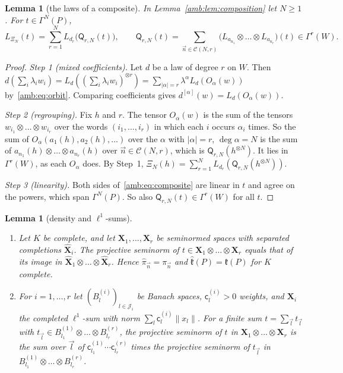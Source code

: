 \documentclass[11pt]{amsart}
\newtheorem{lemma}[theorem]{Lemma}
\theoremstyle{definition}
\theoremstyle{remark}
\numberwithin{equation}{section}
\newcommand{\abs}[1]{\lvert #1\rvert}
\newcommand{\norm}[1]{\lVert #1\rVert}
\theoremstyle{plain}
\theoremstyle{definition}
\theoremstyle{plain}
\begin{document}
\begin{lemma}[the laws of a composite]\label{amb:lem:composite-laws}
In Lemma~\ref{amb:lem:composition} let $N\ge1$. For $t\in\Gamma^N(P)$,
\begin{equation}\label{amb:eq:composite}
 L_{\Xi_N}(t)=\sum_{r=1}^NL_{d_r}\bigl(\mathsf Q_{r,N}(t)\bigr),\qquad
 \mathsf Q_{r,N}(t)=\sum_{\vec n\in\mathcal C(N,r)}\bigl(L_{a_{n_1}}\otimes\dots\otimes L_{a_{n_r}}\bigr)(t)\in\Gamma^r(W).
\end{equation}
\end{lemma}

\begin{proof}
\emph{Step 1 (mixed coefficients).} Let $d$ be a law of degree $r$ on $W$. Then $d(\sum_i\lambda_iw_i)=\allowbreak L_d((\sum_i\lambda_iw_i)^{\otimes r})=\sum_{\abs\alpha=r}\lambda^\alpha L_d(O_\alpha(w))$ by~\eqref{amb:eq:orbit}. Comparing coefficients gives $d^{[\alpha]}(w)=L_d(O_\alpha(w))$.

\emph{Step 2 (regrouping).} Fix $h$ and $r$. The tensor $O_\alpha(w)$ is the sum of the tensors $w_{i_1}\otimes\dots\otimes w_{i_r}$ over the words $(i_1,\dots,i_r)$ in which each $i$ occurs $\alpha_i$ times. So the sum of $O_\alpha(a_1(h),a_2(h),\dots)$ over the $\alpha$ with $\abs\alpha=r$, $\deg\alpha=N$ is the sum of $a_{n_1}(h)\otimes\dots\otimes a_{n_r}(h)$ over $\vec n\in\mathcal C(N,r)$, which is $\mathsf Q_{r,N}(h^{\otimes N})$. It lies in $\Gamma^r(W)$, as each $O_\alpha$ does. By Step~1, $\Xi_N(h)=\sum_{r=1}^NL_{d_r}(\mathsf Q_{r,N}(h^{\otimes N}))$.

\emph{Step 3 (linearity).} Both sides of~\eqref{amb:eq:composite} are linear in $t$ and agree on the powers, which span $\Gamma^N(P)$. So also $\mathsf Q_{r,N}(t)\in\Gamma^r(W)$ for all $t$.
\end{proof}

\begin{lemma}[density and $\ell^1$-sums]\label{amb:lem:ell1}
\leavevmode
\begin{enumerate}
\item Let $K$ be complete, and let $\mathbf X_1,\dots,\mathbf X_r$ be seminormed spaces with separated completions $\widehat{\mathbf X}_i$. The projective seminorm of $t\in\mathbf X_1\otimes\dots\otimes\mathbf X_r$ equals that of its image in $\widehat{\mathbf X}_1\otimes\dots\otimes\widehat{\mathbf X}_r$. Hence $\widehat\pi_{\vec n}=\pi_{\vec n}$ and $\widehat{\mathfrak k}(P)=\mathfrak k(P)$ for $K$ complete.
\item For $i=1,\dots,r$ let $(B^{(i)}_l)_{l\in\mathcal J_i}$ be Banach spaces, $\mathsf c^{(i)}_l>0$ weights, and $\mathbf X_i$ the completed $\ell^1$-sum with norm $\sum_l\mathsf c^{(i)}_l\norm{x_l}$. For a finite sum $t=\sum_{\vec l}t_{\vec l}$ with $t_{\vec l}\in B^{(1)}_{l_1}\otimes\dots\otimes B^{(r)}_{l_r}$, the projective seminorm of $t$ in $\mathbf X_1\otimes\dots\otimes\mathbf X_r$ is the sum over $\vec l$ of $\mathsf c^{(1)}_{l_1}\cdots\mathsf c^{(r)}_{l_r}$ times the projective seminorm of $t_{\vec l}$ in $B^{(1)}_{l_1}\otimes\dots\otimes B^{(r)}_{l_r}$.
\end{enumerate}
\end{lemma}
\end{document}
